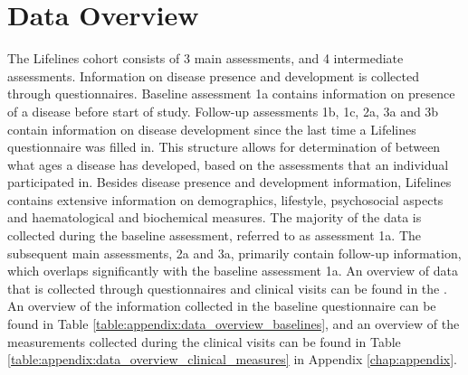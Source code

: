 \section{Data Overview}
\label{section:data:data_overview}
The Lifelines cohort consists of 3 main assessments, and 4 intermediate assessments. Information on disease presence and development is collected through questionnaires. Baseline assessment 1a contains information on presence of a disease before start of study. Follow-up assessments 1b, 1c, 2a, 3a and 3b contain information on disease development since the last time a Lifelines questionnaire was filled in. This structure allows for determination of between what ages a disease has developed, based on the assessments that an individual participated in. Besides disease presence and development information, Lifelines contains extensive information on demographics, lifestyle, psychosocial aspects and haematological and biochemical measures. The majority of the data is collected during the baseline assessment, referred to as assessment 1a. The subsequent main assessments, 2a and 3a, primarily contain follow-up information, which overlaps significantly with the baseline assessment 1a. An overview of data that is collected through questionnaires and clinical visits can be found in the \cite{LLdatacatalogue}. An overview of the information collected in the baseline questionnaire can be found in Table \ref{table:appendix:data_overview_baselines}, and an overview of the measurements collected during the clinical visits can be found in Table \ref{table:appendix:data_overview_clinical_measures} in Appendix \ref{chap:appendix}. %


